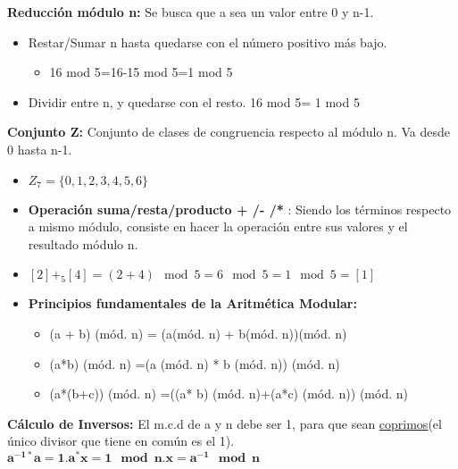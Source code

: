 \documentclass[12pt, twoside, openright]{report} %
\begin{document}
\textbf{Reducción módulo n:} Se busca que a sea un valor entre 0 y n-1.
\begin{itemize}
	\item Restar/Sumar n hasta quedarse con el número positivo más bajo.
	      \begin{itemize}
		      \item 16 mod 5=16-15 mod 5=1 mod 5
	      \end{itemize}
	\item Dividir entre n, y quedarse con el resto. 16 mod 5= 1 mod 5
\end{itemize}
\textbf{Conjunto Z:} Conjunto de clases de congruencia respecto al módulo n. Va desde 0 hasta n-1.
\begin{itemize}
	\item $Z_7 = \{0, 1, 2, 3, 4, 5, 6\}$
\end{itemize}
\begin{itemize}
	\item \textbf{Operación suma/resta/producto + /- /*} : Siendo los términos respecto a mismo módulo, consiste en hacer la operación entre sus valores y el resultado módulo n.
	\item $[2]+_5[4]=(2+4) \mod 5 = 6 \mod 5 = 1 \mod 5 = [1]$
	\item \textbf{Principios fundamentales de la Aritmética Modular:}
	      \begin{itemize}
		      \item (a + b) (mód. n) = (a(mód. n) + b(mód. n))(mód. n)
		      \item (a*b) (mód. n) =(a (mód. n) * b (mód. n)) (mód. n)
		      \item (a*(b+c)) (mód. n) =((a* b) (mód. n)+(a*c) (mód. n)) (mód. n)
	      \end{itemize}
\end{itemize}
\textbf{Cálculo de Inversos:} El m.c.d de a y n debe ser 1, para que sean \underline{coprimos}(el único divisor que tiene en común es el 1). $\boldsymbol{a^{-1*} a=1. a^*x=1 \mod n. x=a^{-1} \mod n}$
\end{document}
